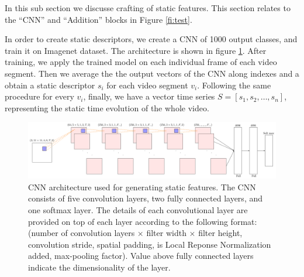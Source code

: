 In this sub section we discusse crafting of static features. This section relates to 
the ``CNN'' and ``Addition'' blocks in Figure \ref{fi:test}.

In order to create static descriptors, we create a CNN of 1000 output classes, and train it on Imagenet dataset. The architecture is shown in figure \ref{fi:cnn}.
After training, we apply the trained model on each individual frame of each video segment. Then we average the the output vectors of the CNN
along indexes and a obtain a static descriptor $s_{i}$ for each video segment $v_{i}$. Following the same
procedure for every $v_{i}$, finally, we have a vector time series 
$S =[s_{1}, s_{2}, \dots, s_{n}]$, representing the static time evolution of the whole video. 

\begin{figure}
  \centering
  \includegraphics[scale=0.5]{./figures/nw.pdf} 
  \caption{CNN architecture used for generating static features. The CNN consists of five convolution layers, 
  two fully connected layers, and one softmax layer. The details of each convolutional layer are provided on top of each layer
  according to the following format:(number of convolution layers $\times$ filter width $\times$ filter height, convolution stride, 
  spatial padding, is Local Reponse Normalization added, max-pooling factor). Value above fully connected layers indicate the dimensionality of the layer.}
\label{fi:cnn}
\end{figure}